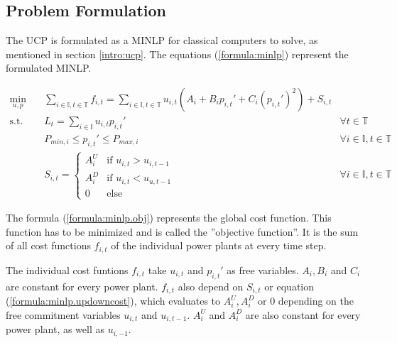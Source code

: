 \subsection{Problem Formulation}

The UCP is formulated as a MINLP for classical computers to solve,
as mentioned in section \ref{intro:ucp}.
The equations (\ref{formula:minlp}) represent the formulated MINLP.

\begin{subequations}
\begin{align}
  \min_{u, p} \quad &
  \sum_{i \in \mathbb{I}, t \in \mathbb{T}} f_{i, t}
  = \sum_{i \in \mathbb{I}, t \in \mathbb{T}}
    u_{i, t} (A_i + B_i p_{i, t}' + C_i (p_{i, t}')^2) + S_{i, t}
  \label{formula:minlp.obj} \\
  \text{s.t.} \quad & L_t = \sum_{i \in \mathbb{I}} u_{i, t} p_{i, t}' \quad &
  \forall t \in \mathbb{T}
  \label{formula:minlp.load} \\
  &
  P_{min, i} \leq p_{i, t}' \leq P_{max, i} \quad &
  \forall i \in \mathbb{I}, t \in \mathbb{T}
  \label{formula:minlp.power} \\
  &
  S_{i, t} = \begin{cases}
    A_i^U & \text{if } u_{i, t} > u_{i, t-1} \\
    A_i^D & \text{if } u_{i, t} < u_{u, t-1} \\
    0 & \text{else}
  \end{cases} \quad &
  \forall i \in \mathbb{I}, t \in \mathbb{T}
  \label{formula:minlp.updowncost}
\end{align}
\label{formula:minlp}
\end{subequations}

The formula (\ref{formula:minlp.obj}) represents the global cost function.
This function has to be minimized and is called the ''objective function''.
It is the sum of all cost functions $f_{i, t}$ of the individual power plants at every time step.

The individual cost funtions $f_{i, t}$ take $u_{i, t}$ and $p_{i, t}'$ as free variables.
$A_i, B_i$ and $C_i$ are constant for every power plant.
$f_{i, t}$ also depend on $S_{i, t}$ or equation (\ref{formula:minlp.updowncost}),
which evaluates to $A_i^U, A_i^D$ or $0$ depending on the free commitment variables $u_{i, t}$ and $u_{i, t-1}$.
$A_i^U$ and $A_i^D$ are also constant for every power plant,
as well as $u_{i, -1}$.

